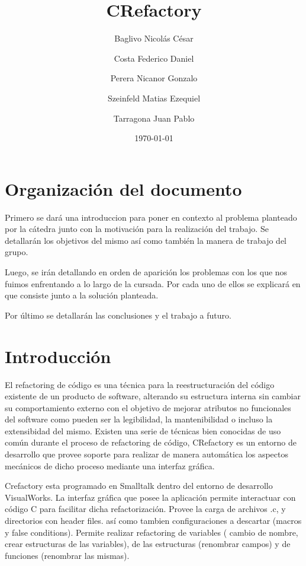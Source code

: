 \documentclass[a4paper,oneside,10pt]{article}
\begin{document}

\title{CRefactory}
\author{Baglivo Nicol\'as C\'esar \and Costa Federico Daniel \and Perera Nicanor Gonzalo \and Szeinfeld Matias Ezequiel \and Tarragona Juan Pablo}
\date{\today}
\maketitle

\tableofcontents

\newpage
\section{Organizaci\'on del documento}
Primero se dará una introduccion para poner en contexto al problema planteado por la c\'atedra junto con la  motivaci\'on para la realizaci\'on del trabajo. Se detallar\'an los objetivos del mismo así como tambi\'en la manera de trabajo del grupo.

Luego, se ir\'an detallando en orden de aparici\'on los problemas con los que nos fuimos enfrentando a lo largo de la cursada. Por cada uno de ellos se explicar\'a en que consiste junto a la soluci\'on planteada.

Por \'ultimo se detallar\'an las conclusiones y el trabajo a futuro.

\section{Introducción}
El refactoring de c\'odigo es una técnica para la reestructuración del código existente de un producto de software, alterando su estructura interna sin cambiar su comportamiento externo con el objetivo de mejorar atributos no funcionales del software como pueden ser la legibilidad, la mantenibilidad o incluso la extensibidad del mismo. Existen una serie de t\'ecnicas bien conocidas de uso com\'un durante el proceso de refactoring de c\'odigo, CRefactory es un entorno de desarrollo que provee soporte para realizar de manera autom\'atica los aspectos mec\'anicos de dicho proceso mediante una interfaz gr\'afica.

Crefactory esta programado en Smalltalk dentro del entorno de desarrollo VisualWorks. La interfaz gr\'afica que posee la aplicaci\'on permite interactuar con c\'odigo C para facilitar dicha refactorizaci\'on. Provee la carga de archivos .c, y directorios con header files. as\'i como tambien configuraciones a descartar (macros y false conditions).  
Permite realizar refactoring de variables ( cambio de nombre, crear estructuras de las variables), de las estructuras (renombrar campos) y de funciones (renombrar las mismas).
\end{document}
